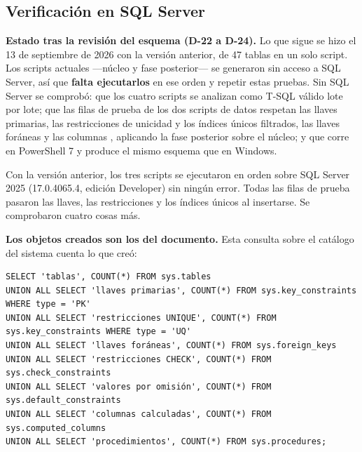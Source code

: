 \subsection*{Verificación en SQL Server}

\textbf{Estado tras la revisión del esquema (\mbox{D-22} a \mbox{D-24}).} Lo que sigue se hizo el 13 de septiembre de 2026 con la versión anterior, de 47 tablas en un solo script. Los scripts actuales ---núcleo y fase posterior--- se generaron sin acceso a SQL Server, así que \textbf{falta ejecutarlos} en ese orden y repetir estas pruebas. Sin SQL Server se comprobó: que los cuatro scripts se analizan como T-SQL válido lote por lote; que las filas de prueba de los dos scripts de datos respetan las llaves primarias, las restricciones de unicidad y los índices únicos filtrados, las llaves foráneas y las columnas , aplicando la fase posterior sobre el núcleo; y que  corre en PowerShell 7 y produce el mismo esquema que en Windows.

Con la versión anterior, los tres scripts se ejecutaron en orden sobre SQL Server 2025 (17.0.4065.4, edición Developer) sin ningún error. Todas las filas de prueba pasaron las llaves, las restricciones  y los índices únicos al insertarse. Se comprobaron cuatro cosas más.

\textbf{Los objetos creados son los del documento.} Esta consulta sobre el catálogo del sistema cuenta lo que  creó:

\begin{lstlisting}[style=sql, basicstyle=\ttfamily\footnotesize]
SELECT 'tablas', COUNT(*) FROM sys.tables
UNION ALL SELECT 'llaves primarias', COUNT(*) FROM sys.key_constraints WHERE type = 'PK'
UNION ALL SELECT 'restricciones UNIQUE', COUNT(*) FROM sys.key_constraints WHERE type = 'UQ'
UNION ALL SELECT 'llaves foráneas', COUNT(*) FROM sys.foreign_keys
UNION ALL SELECT 'restricciones CHECK', COUNT(*) FROM sys.check_constraints
UNION ALL SELECT 'valores por omisión', COUNT(*) FROM sys.default_constraints
UNION ALL SELECT 'columnas calculadas', COUNT(*) FROM sys.computed_columns
UNION ALL SELECT 'procedimientos', COUNT(*) FROM sys.procedures;
\end{lstlisting}

